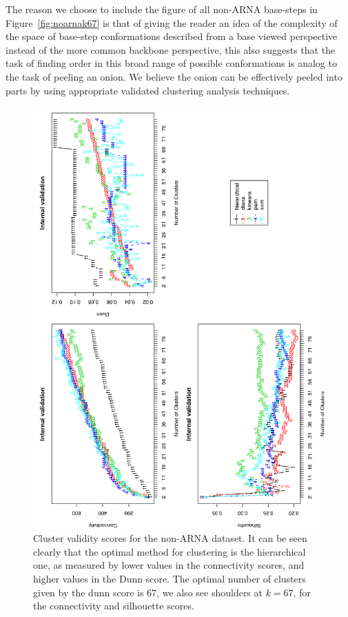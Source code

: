 The reason we choose to  include the figure of all non-ARNA base-steps
in Figure~\ref{fig:noarnak67} is that of  giving the reader an idea of
the complexity of the  space of base-step conformations described from
a  base  viewed  perspective  instead  of  the  more  common  backbone
perspective, this also suggests that the task of finding order in this
broad range of possible conformations is analog to the task of peeling
an onion. We believe the onion can be effectively peeled into parts by
using  appropriate validated clustering  analysis techniques.

\begin{figure}
 \centering
\includegraphics[angle=0, scale=0.9]{Chapter2/noarna_val.png}
\caption{Cluster validity  scores for the non-ARNA dataset.  It can be
  seen  clearly  that  the   optimal  method  for  clustering  is  the
  hierarchical one,  as measured by  lower values in  the connectivity
  scores, and higher  values in the Dunn score.  The optimal number of
  clusters given  by the dunn  score is 67,  we also see  shoulders at
  $k=67$, for the connectivity and silhouette scores.}
 \label{fig:noarna}
\end{figure}

